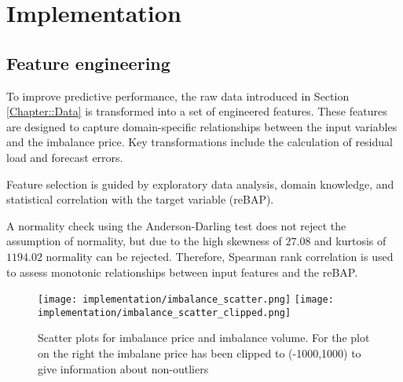 \documentclass[class=scrbook, crop=false]{standalone}
\begin{document}
\chapter{Implementation} %
\label{Chapter::Implementation}

\section{Feature engineering}
\label{Section::Feature_engineering}
To improve predictive performance, the raw data introduced in Section \ref{Chapter::Data} is transformed into a set of engineered features. These features are designed to capture domain-specific relationships between the input variables and the imbalance price. Key transformations include the calculation of residual load and forecast errors.

Feature selection is guided by exploratory data analysis, domain knowledge, and statistical correlation with the target variable (\gls{reBAP}).


A normality check using the Anderson-Darling \cite{andersonAsymptoticTheoryCertain1952} test does not reject the assumption of normality, but due to the high skewness of $27.08$ and kurtosis of $1194.02$ normality can be rejected. Therefore, Spearman rank correlation is used to assess monotonic relationships between input features and the \gls{reBAP}.

\begin{figure}[H]
            \centering
            \texttt{[image: implementation/imbalance\_scatter.png]}
            \texttt{[image: implementation/imbalance\_scatter\_clipped.png]}
            \caption[Scatter plots for imbalance price and imbalance volume. For the plot on the right the imbalane price has been clipped to (-1000,1000) to give information about non-outliers]{Scatter plots for imbalance price and imbalance volume. For the plot on the right the imbalane price has been clipped to (-1000,1000) to give information about non-outliers}
            \label{Figure::volume_price_scatter}
\end{figure}

\end{document}
